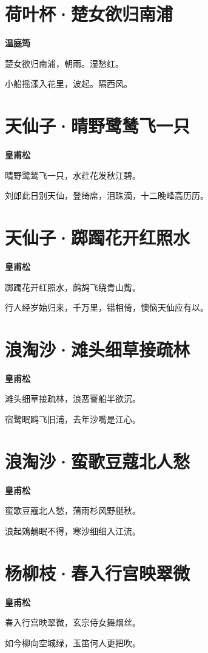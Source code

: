\documentclass[12pt,a4paper]{ctexbook}
\begin{document}
\section{荷叶杯·楚女欲归南浦}
\textbf{温庭筠}\par\vspace{0.5em}
楚女欲归南浦，朝雨。湿愁红。\par
小船摇漾入花里，波起。隔西风。\par

\section{天仙子·晴野鹭鸶飞一只}
\textbf{皇甫松}\par\vspace{0.5em}
晴野鹭鸶飞一只，水荭花发秋江碧。\par
刘郎此日别天仙，登绮席，泪珠滴，十二晚峰高历历。\par

\section{天仙子·踯躅花开红照水}
\textbf{皇甫松}\par\vspace{0.5em}
踯躅花开红照水，鹧鸪飞绕青山觜。\par
行人经岁始归来，千万里，错相倚，懊恼天仙应有以。\par

\section{浪淘沙·滩头细草接疏林}
\textbf{皇甫松}\par\vspace{0.5em}
滩头细草接疏林，浪恶罾船半欲沉。\par
宿鹭眠鸥飞旧浦，去年沙嘴是江心。\par

\section{浪淘沙·蛮歌豆蔻北人愁}
\textbf{皇甫松}\par\vspace{0.5em}
蛮歌豆蔻北人愁，蒲雨杉风野艇秋。\par
浪起鵁鶄眠不得，寒沙细细入江流。\par

\section{杨柳枝·春入行宫映翠微}
\textbf{皇甫松}\par\vspace{0.5em}
春入行宫映翠微，玄宗侍女舞烟丝。\par
如今柳向空城绿，玉笛何人更把吹。\par
\end{document}
